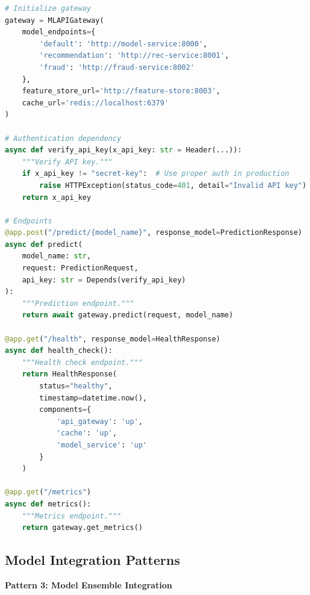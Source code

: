 \begin{lstlisting}[language=Python, caption=API Gateway for ML System]
# Initialize gateway
gateway = MLAPIGateway(
    model_endpoints={
        'default': 'http://model-service:8000',
        'recommendation': 'http://rec-service:8001',
        'fraud': 'http://fraud-service:8002'
    },
    feature_store_url='http://feature-store:8003',
    cache_url='redis://localhost:6379'
)

# Authentication dependency
async def verify_api_key(x_api_key: str = Header(...)):
    """Verify API key."""
    if x_api_key != "secret-key":  # Use proper auth in production
        raise HTTPException(status_code=401, detail="Invalid API key")
    return x_api_key

# Endpoints
@app.post("/predict/{model_name}", response_model=PredictionResponse)
async def predict(
    model_name: str,
    request: PredictionRequest,
    api_key: str = Depends(verify_api_key)
):
    """Prediction endpoint."""
    return await gateway.predict(request, model_name)

@app.get("/health", response_model=HealthResponse)
async def health_check():
    """Health check endpoint."""
    return HealthResponse(
        status="healthy",
        timestamp=datetime.now(),
        components={
            'api_gateway': 'up',
            'cache': 'up',
            'model_service': 'up'
        }
    )

@app.get("/metrics")
async def metrics():
    """Metrics endpoint."""
    return gateway.get_metrics()
\end{lstlisting}

\subsection{Model Integration Patterns}

\textbf{Pattern 3: Model Ensemble Integration}


